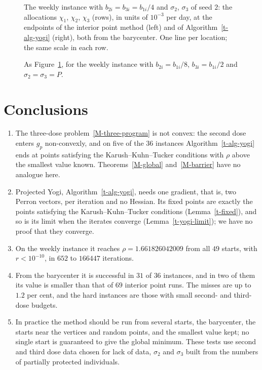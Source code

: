 \documentclass[11pt]{article}
\theoremstyle{plain}
\theoremstyle{remark}
\numberwithin{equation}{section}
\begin{document}
\begin{figure}[ht]
\centering
{}
\caption{The weekly instance with $b_{2i}=b_{3i}=b_{1i}/4$ and $\sigma_2$,
$\sigma_3$ of seed $2$: the allocations $\chi_1$, $\chi_2$, $\chi_3$ (rows),
in units of $10^{-3}$ per day, at the endpoints of the interior point method
(left) and of Algorithm~\ref{t-alg-yogi} (right), both from the barycenter. One
line per location; the same scale in each row.}\label{t-fig-alloc-s2}
\end{figure}

\begin{figure}[ht]
\centering
{}
\caption{As Figure~\ref{t-fig-alloc-s2}, for the weekly instance with
$b_{2i}=b_{1i}/8$, $b_{3i}=b_{1i}/2$ and $\sigma_2=\sigma_3=P$.}\label{t-fig-alloc-p}
\end{figure}

\section{Conclusions}\label{t-conclusions}

\begin{enumerate}
\item The three-dose problem~\eqref{M-three-program} is not convex: the
second dose enters $g_p$ non-convexly, and on five of the $36$ instances
Algorithm~\ref{t-alg-yogi} ends at points satisfying the
Karush--Kuhn--Tucker conditions with $\rho$ above the smallest value known.
Theorems~\ref{M-global} and~\ref{M-barrier} have no analogue here.
\item Projected Yogi, Algorithm~\ref{t-alg-yogi}, needs one gradient, that is,
two Perron vectors, per iteration and no Hessian. Its fixed points are exactly
the points satisfying the Karush--Kuhn--Tucker conditions
(Lemma~\ref{t-fixed}), and so is its limit when the iterates converge
(Lemma~\ref{t-yogi-limit}); we have no proof that they converge.
\item On the weekly instance it reaches $\rho=1.661826042009$ from all $49$
starts, with $r<10^{-10}$, in $652$ to $166447$ iterations.
\item From the barycenter it is successful in $31$ of $36$ instances, and in
two of them its value is smaller than that of $69$ interior point runs. The
misses are up to $1.2$ per cent, and the hard instances are those with small
second- and third-dose budgets.
\item In practice the method should be run from several starts, the
barycenter, the starts near the vertices and random points, and the smallest
value kept; no single start is guaranteed to give the global minimum. These
tests use second and third dose data chosen for lack of data, $\sigma_2$ and
$\sigma_3$ built from the numbers of partially protected individuals.
\end{enumerate}
\end{document}
